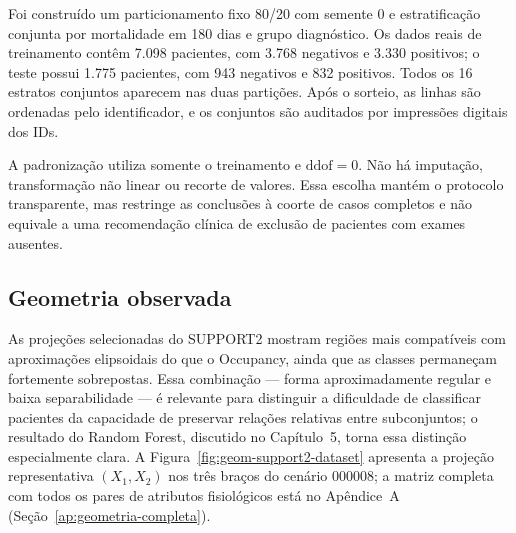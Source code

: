 Foi construído um particionamento fixo 80/20 com semente 0 e estratificação conjunta por mortalidade em 180 dias e grupo diagnóstico. Os dados reais de treinamento contêm 7.098 pacientes, com 3.768 negativos e 3.330 positivos; o teste possui 1.775 pacientes, com 943 negativos e 832 positivos. Todos os 16 estratos conjuntos aparecem nas duas partições. Após o sorteio, as linhas são ordenadas pelo identificador, e os conjuntos são auditados por impressões digitais dos IDs.

A padronização utiliza somente o treinamento e $\mathrm{ddof}=0$. Não há imputação, transformação não linear ou recorte de valores. Essa escolha mantém o protocolo transparente, mas restringe as conclusões à coorte de casos completos e não equivale a uma recomendação clínica de exclusão de pacientes com exames ausentes.

\subsection{Geometria observada}

As projeções selecionadas do SUPPORT2 mostram regiões mais compatíveis com aproximações elipsoidais do que o Occupancy, ainda que as classes permaneçam fortemente sobrepostas. Essa combinação --- forma aproximadamente regular e baixa separabilidade --- é relevante para distinguir a dificuldade de classificar pacientes da capacidade de preservar relações relativas entre subconjuntos; o resultado do Random Forest, discutido no Capítulo~5, torna essa distinção especialmente clara. A Figura~\ref{fig:geom-support2-dataset} apresenta a projeção representativa $(X_1,X_2)$ nos três braços do cenário 000008; a matriz completa com todos os pares de atributos fisiológicos está no Apêndice~A (Seção~\ref{ap:geometria-completa}).

